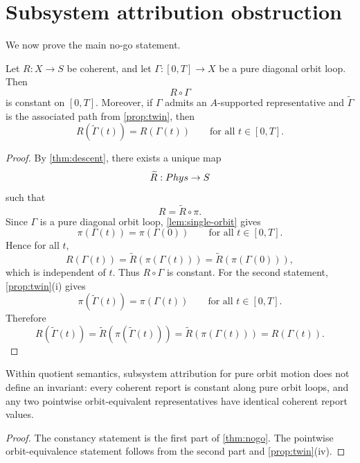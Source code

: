 \section{Subsystem attribution obstruction}
\label{sec:nogo}
We now prove the main no-go statement.
\begin{theorem}[No-go theorem]
	\label{thm:nogo}
	Let \(R:X\to S\) be coherent, and let \(\Gamma:[0,T]\to X\) be a pure
	diagonal orbit loop. Then
	\[
		R\circ \Gamma
	\]
	is constant on \([0,T]\).
	Moreover, if \(\Gamma\) admits an \(A\)-supported representative and
	\(\widetilde\Gamma\) is the associated path from \cref{prop:twin}, then
	\[
		R(\widetilde\Gamma(t))=R(\Gamma(t))
		\qquad
		\text{for all }t\in[0,T].
	\]
\end{theorem}
\begin{proof}
	By \cref{thm:descent}, there exists a unique map
	\[
		\widetilde R:Phys\to S
	\]
	such that
	\[
		R=\widetilde R\circ\pi.
	\]
	Since \(\Gamma\) is a pure diagonal orbit loop,
	\cref{lem:single-orbit} gives
	\[
		\pi(\Gamma(t))=\pi(\Gamma(0))
		\qquad
		\text{for all }t\in[0,T].
	\]
	Hence for all \(t\),
	\[
		R(\Gamma(t))
		=
		\widetilde R(\pi(\Gamma(t)))
		=
		\widetilde R(\pi(\Gamma(0))),
	\]
	which is independent of \(t\). Thus \(R\circ\Gamma\) is constant.
	For the second statement, \cref{prop:twin}(i) gives
	\[
		\pi(\widetilde\Gamma(t))=\pi(\Gamma(t))
		\qquad
		\text{for all }t\in[0,T].
	\]
	Therefore
	\[
		R(\widetilde\Gamma(t))
		=
		\widetilde R(\pi(\widetilde\Gamma(t)))
		=
		\widetilde R(\pi(\Gamma(t)))
		=
		R(\Gamma(t)).
	\]
\end{proof}
\begin{corollary}
	Within quotient semantics, subsystem attribution for pure orbit motion
	does not define an invariant: every coherent report is constant along
	pure orbit loops, and any two pointwise orbit-equivalent
	representatives have identical coherent report values.
\end{corollary}
\begin{proof}
	The constancy statement is the first part of \cref{thm:nogo}. The
	pointwise orbit-equivalence statement follows from the second part and
	\cref{prop:twin}(iv).
\end{proof}
